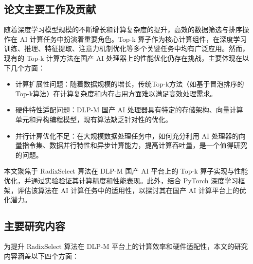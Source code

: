 


\subsection{论文主要工作及贡献}
随着深度学习模型规模的不断增长和计算复杂度的提升，高效的数据筛选与排序操作在 AI 计算任务中扮演着重要角色。Top-k 算子作为核心计算组件，在深度学习训练、推理、特征提取、注意力机制优化等多个关键任务中均有广泛应用。然而，现有的 Top-k 计算方法在国产 AI 处理器上的性能优化仍存在挑战，主要体现在以下几个方面：

\begin{itemize}
    \item 计算扩展性问题：随着数据规模的增长，传统Top-k方法（如基于冒泡排序的Top-k算法）在计算复杂度和内存占用方面难以满足高效处理需求。
    \item 硬件特性适配问题：DLP-M 国产 AI 处理器具有特定的存储架构、向量计算单元和异构编程模型，现有算法缺乏针对性的优化。
    \item 并行计算优化不足：在大规模数据处理任务中，如何充分利用 AI 处理器的向量指令集、数据并行特性和异步计算能力，提高计算吞吐量，是一个值得研究的问题。
\end{itemize}

本文聚焦于 RadixSelect 算法在 DLP-M 国产 AI 平台上的 Top-k 算子实现与性能优化，并通过实验验证其计算精度和性能表现。此外，结合 PyTorch 深度学习框架，评估该算法在 AI 计算任务中的适用性，以探讨其在国产 AI 计算平台上的优化潜力。

\subsection{主要研究内容}

为提升 RadixSelect 算法在 DLP-M 平台上的计算效率和硬件适配性，本文的研究内容涵盖以下四个方面：


